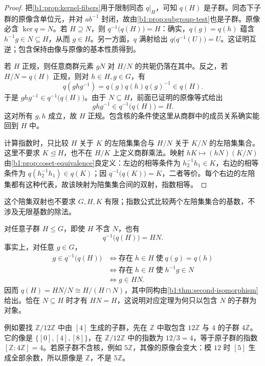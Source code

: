 \begin{proof}
	把\cref{b1:prop:kernel-fibers}用于限制同态 \(q|_H\)，可知 \(q(H)\) 是子群。同态下子群的原像含单位元，并对 \(ab^{-1}\) 封闭，故由\cref{b1:prop:subgroup-test}也是子群。原像必含 \(\ker q=N\)。若 \(H\supseteq N\)，则 \(q^{-1}\bigl(q(H)\bigr)=H\)：确实，\(q(g)=q(h)\) 蕴含 \(h^{-1}g\in N\subseteq H\)，从而 \(g\in H\)。另一方面，\(q\) 满射给出 \(q\bigl(q^{-1}(U)\bigr)=U\)。这证明互逆；包含保持由像与原像的基本性质得到。

	若 \(H\) 正规，则任意商群元素 \(gN\) 对 \(H/N\) 的共轭仍落在其中。反之，若 \(H/N=q(H)\) 正规，则对 \(h\in H,g\in G\)，有
	\[
		q(ghg^{-1})=q(g)q(h)q(g)^{-1}\in q(H).
	\]
	于是 \(ghg^{-1}\in q^{-1}\bigl(q(H)\bigr)\)。由于 \(N\subseteq H\)，前面已证明的原像等式给出
	\[
		ghg^{-1}\in q^{-1}\bigl(q(H)\bigr)=H.
	\]
	这对所有 \(g,h\) 成立，故 \(H\) 正规。包含核的条件使这里从商群中的成员关系确实能回到 \(H\) 中。

	计算指数时，只比较 \(H\) 关于 \(K\) 的左陪集集合与 \(H/N\) 关于 \(K/N\) 的左陪集集合。这里不要求 \(K\trianglelefteq H\)，也不在 \(H/K\) 上定义商群乘法。映射 \(hK\mapsto(hN)(K/N)\) 由\cref{b1:prop:coset-equivalence}良定义：左边的相等条件为 \(h_2^{-1}h_1\in K\)，右边的相等条件为 \(q(h_2^{-1}h_1)\in q(K)\)；因 \(q^{-1}\bigl(q(K)\bigr)=K\)，二者等价。每个右边的左陪集都有这种代表，故该映射为陪集集合间的双射，指数相等。
\end{proof}

这个陪集双射也不要求 \(G,H,K\) 有限；指数公式比较两个左陪集集合的基数，不涉及无限基数的除法。

\ProseParagraphBreak
对任意子群 \(H\leq G\)，即使 \(H\) 不含 \(N\)，也有
\[
	q^{-1}\bigl(q(H)\bigr)=HN.
\]
事实上，对任意 \(g\in G\)，
\[
	\begin{aligned}
		g\in q^{-1}\bigl(q(H)\bigr) &\Longleftrightarrow \text{存在}\;h\in H\;\text{使}\;q(g)=q(h)\\
		&\Longleftrightarrow \text{存在}\;h\in H\;\text{使}\;h^{-1}g\in N\\
		&\Longleftrightarrow g\in HN.
	\end{aligned}
\]
因而 \(q(H)=HN/N\cong H/(H\cap N)\)，其中同构由\cref{b1:thm:second-isomorphism}给出。恰在 \(N\subseteq H\) 时才有 \(HN=H\)，这说明对应定理为何只以包含 \(N\) 的子群为对象。

\ProseParagraphBreak
例如要找 \(\mathbb Z/12\mathbb Z\) 中由 \([4]\) 生成的子群，先在 \(\mathbb Z\) 中取包含 \(12\mathbb Z\) 与 \(4\) 的子群 \(4\mathbb Z\)。它的像是 \(\bigl\{[0],[4],[8]\bigr\}\)，在 \(\mathbb Z/12\mathbb Z\) 中的指数为 \(12/3=4\)，等于原子群的指数 \([\mathbb Z:4\mathbb Z]=4\)。若原子群不含核，例如 \(5\mathbb Z\)，其像的原像会变大：模 \(12\) 时 \([5]\) 生成全部余数，所以原像是 \(\mathbb Z\)，不是 \(5\mathbb Z\)。

